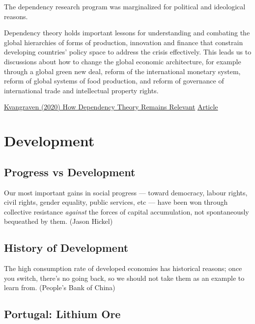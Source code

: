 \documentclass[
]{book}
\begin{document}
The dependency research program was marginalized for political and ideological reasons.

Dependency theory holds important lessons for understanding and combating the global hierarchies of forms of production, innovation and finance that constrain developing countries' policy space to address the crisis effectively. This leads us to discussions about how to change the global economic architecture, for example through a global green new deal, reform of the international monetary system, reform of global systems of food production, and reform of governance of international trade and intellectual property rights.

\href{https://www.ppesydney.net/beyond-the-stereotype-how-dependency-theory-remains-relevant/}{Kvangraven (2020) How Dependency Theory Remains Relevant}
\href{https://onlinelibrary.wiley.com/doi/full/10.1111/dech.12593}{Article}

\hypertarget{development}{%
\chapter{Development}\label{development}}

\hypertarget{progress-vs-development}{%
\section{Progress vs Development}\label{progress-vs-development}}

Our most important gains in social progress --- toward democracy, labour rights, civil rights, gender equality, public services, etc --- have been won through collective resistance \emph{against} the forces of capital accumulation, not spontaneously bequeathed by them. (Jason Hickel)

\hypertarget{history-of-development}{%
\section{History of Development}\label{history-of-development}}

The high consumption rate of developed economies has historical reasons; once you switch, there's no going back, so we should not take them as an example to learn from. (People's Bank of China)

\hypertarget{portugal-lithium-ore}{%
\section{Portugal: Lithium Ore}\label{portugal-lithium-ore}}
\end{document}

